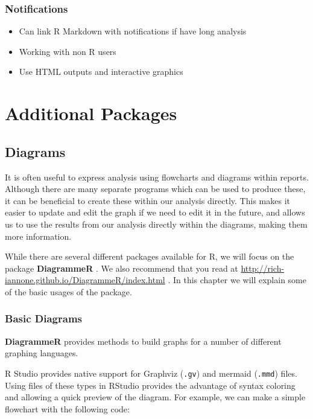 \documentclass[]{book}
\providecommand{\tightlist}{%
  \setlength{\itemsep}{0pt}\setlength{\parskip}{0pt}}
\begin{document}
\section{Notifications}\label{notifications}

\begin{itemize}
\tightlist
\item
  Can link R Markdown with notifications if have long analysis
\end{itemize}

\begin{itemize}
\tightlist
\item
  Working with non R users
\item
  Use HTML outputs and interactive graphics
\end{itemize}

\part{Additional Packages}\label{part-additional-packages}

\chapter{Diagrams}\label{diagrams}

It is often useful to express analysis using flowcharts and diagrams
within reports. Although there are many separate programs which can be
used to produce these, it can be beneficial to create these within our
analysis directly. This makes it easier to update and edit the graph if
we need to edit it in the future, and allows us to use the results from
our analysis directly within the diagrams, making them more information.

While there are several different packages available for R, we will
focus on the package \textbf{DiagrammeR} \citep{R-DiagrammeR}. We also
recommend that you read at
\url{http://rich-iannone.github.io/DiagrammeR/index.html} . In this
chapter we will explain some of the basic usages of the package.

\section{Basic Diagrams}\label{basic-diagrams}

\textbf{DiagrammeR} provides methods to build graphs for a number of
different graphing languages.

R Studio provides native support for Graphviz (\texttt{.gv}) and mermaid
(\texttt{.mmd}) files. Using files of these types in RStudio provides
the advantage of syntax coloring and allowing a quick preview of the
diagram. For example, we can make a simple flowchart with the following
code:
\end{document}
